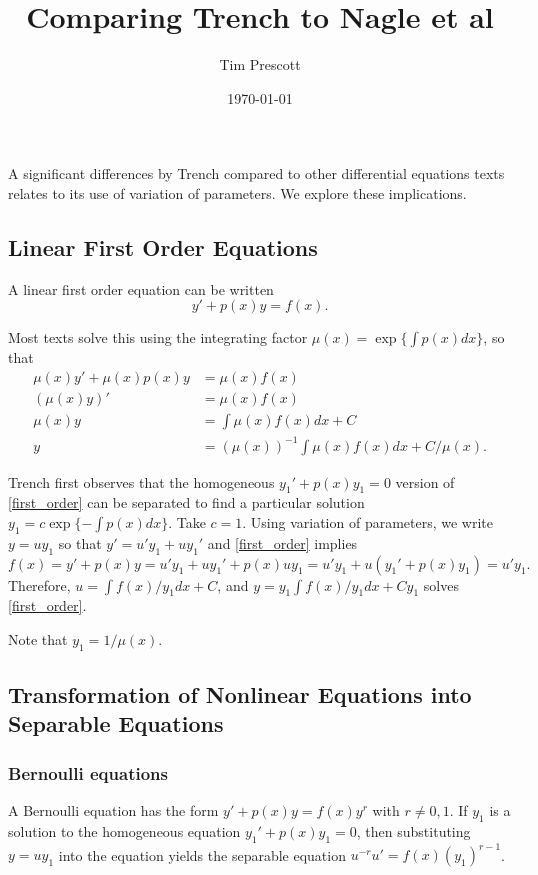 \documentclass{article}
\title{Comparing Trench to Nagle et al}
\author{Tim Prescott}
\date{\today}
\begin{document}
\maketitle
A significant differences by Trench compared to other differential equations texts relates to its use of variation of parameters.
We explore these implications.

\setcounter{section}{2}
\subsection{Linear First Order Equations}

A linear first order equation can be written
\begin{equation}
y'+p(x)y=f(x).\label{first_order}
\end{equation}

Most texts solve this using the integrating factor $\mu(x)=\exp\{\int p(x)dx\}$, so that
\begin{align*}
\mu(x)y'+\mu(x)p(x)y&=\mu(x)f(x)\\
(\mu(x)y)'&=\mu(x)f(x)\\
\mu(x)y&=\int\mu(x)f(x)dx+C\\
y&=(\mu(x))^{-1}\int\mu(x)f(x)dx+C/\mu(x).
\end{align*}

Trench first observes that the homogeneous $y_1'+p(x)y_1=0$ version of \eqref{first_order} can be separated to find a particular solution $y_1=c\exp\{-\int p(x)dx\}$.
Take $c=1$.
Using variation of parameters, we write $y=uy_1$ so that $y'=u'y_1+uy_1'$ and \eqref{first_order} implies
\[
f(x)=y'+p(x)y=u'y_1+uy_1'+p(x)uy_1=u'y_1+u(y_1'+p(x)y_1)=u'y_1.
\]
Therefore, $u=\int f(x)/y_1dx+C$, and $y=y_1\int f(x)/y_1dx+Cy_1$ solves \eqref{first_order}.

Note that $y_1=1/\mu(x)$.

\setcounter{subsection}{3}
\subsection{Transformation of Nonlinear Equations into Separable Equations}

\subsubsection{Bernoulli equations}

A Bernoulli equation has the form $y'+p(x)y=f(x)y^r$ with $r\ne0,1$.  If $y_1$ is a solution to the homogeneous equation $y_1'+p(x)y_1=0$, then substituting $y=uy_1$ into the equation yields the separable equation $u^{-r}u'=f(x)(y_1)^{r-1}$.
\end{document}
